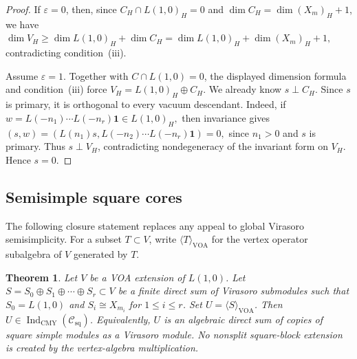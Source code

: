 \documentclass[10pt,a4paper]{amsart}
\numberwithin{equation}{section} \newtheorem{thm}{Theorem}[section] \newtheorem{lem}[thm]{Lemma} \newtheorem{ex}[thm]{Example} \newtheorem{prop}[thm]{Proposition} \newtheorem{cor}[thm]{Corollary} \newtheorem{defi}[thm]{Definition} \newtheorem{rmk}[thm]{Remark} \newtheorem{notation}[thm]{Notation}
\newcommand{\one}{\mathbf{1}}
\newcommand{\Csq}{\mathcal C_{\mathrm{sq}}}
\newcommand{\IndCMY}{\operatorname{Ind}_{\mathrm{CMY}}}
\begin{document}
\begin{proof}
If $\varepsilon=0$, then, since $C_H\cap L(1,0)_H=0$ and $\dim C_H=\dim(X_m)_H+1$, we have \(\dim V_H\ge\dim L(1,0)_H+\dim C_H=\dim L(1,0)_H+\dim(X_m)_H+1,\) contradicting condition~\textnormal{(iii)}.

Assume $\varepsilon=1$. Together with $C\cap L(1,0)=0$, the displayed dimension formula and condition~\textnormal{(iii)} force \(V_H=L(1,0)_H\oplus C_H.\) We already know $s\perp C_H$. Since $s$ is primary, it is orthogonal to every vacuum descendant. Indeed, if $ w=L(-n_1)\cdots L(-n_r)\one\in L(1,0)_H, $ then invariance gives $ (s,w) =(L(n_1)s,L(-n_2)\cdots L(-n_r)\one)=0, $ since $n_1>0$ and $s$ is primary. Thus $s\perp V_H$, contradicting nondegeneracy of the invariant form on $V_H$. Hence $s=0$.
\end{proof}

\subsection{Semisimple square cores}

The following closure statement replaces any appeal to global Virasoro semisimplicity. For a subset $T\subset V$, write \(\langle T\rangle_{\mathrm{VOA}}\) for the vertex operator subalgebra of $V$ generated by $T$.

\begin{thm}\label{thm:square-core}
Let $V$ be a VOA extension of $L(1,0)$. Let \(S=S_0\oplus S_1\oplus\cdots\oplus S_r\subset V\) be a finite direct sum of Virasoro submodules such that \(S_0=L(1,0)\) and \(S_i\cong X_{m_i}\) for \(1\le i\le r\). Set \(U=\langle S\rangle_{\mathrm{VOA}}\). Then \(U\in\IndCMY(\Csq)\). Equivalently, $U$ is an algebraic direct sum of copies of square simple modules as a Virasoro module. No nonsplit square-block extension is created by the vertex-algebra multiplication.
\end{thm}
\end{document}
